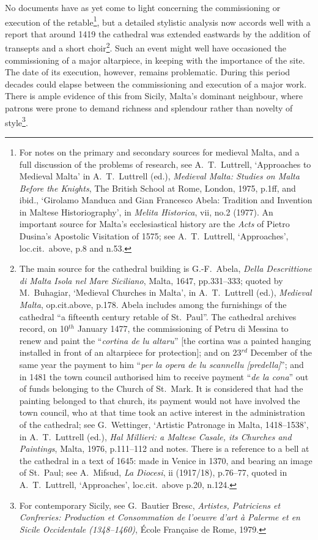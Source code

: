 \documentclass[a4paper,12pt]{article}
\begin{document}
No documents have as yet come to light concerning the commissioning or
execution of the retable\footnote{For notes on the primary and
secondary sources for medieval Malta, and a full discussion of the
problems of research, see A.~T.~Luttrell, `Approaches to Medieval Malta'
in A.~T.~Luttrell (ed.), \textit{Medieval Malta: Studies on Malta Before
the Knights}, The British School at Rome, London, 1975, p.1ff, and
ibid., `Girolamo Manduca and Gian Francesco Abela: Tradition and
Invention in Maltese Historiography', in \textit{Melita Historica},
vii, no.2 (1977). An important source for Malta's ecclesiastical
history are the \textit{Acts} of Pietro Dusina's Apostolic Visitation
of 1575; see A.~T.~Luttrell, `Approaches', loc.cit.~above, p.8 and n.53.
}, but a detailed stylistic analysis now accords well with a report
that around 1419 the cathedral was extended eastwards by the addition
of transepts and a short choir\footnote{The main source for the
cathedral building is G.-F.~Abela, \textit{Della Descrittione di Malta
Isola nel Mare Siciliano}, Malta, 1647, pp.331--333; quoted by
M.~Buhagiar, `Medieval Churches in Malta', in A.~T.~Luttrell (ed.),
\textit{Medieval Malta}, op.cit.above, p.178. Abela includes among the
furnishings of the cathedral ``a fifteenth century retable of
St.~Paul''. The cathedral archives record, on 10$^{th}$ January 1477,
the commissioning of Petru di Messina to renew and paint the
``\textit{cortina de lu altaru}'' [the cortina was a painted hanging
installed in front of an altarpiece for protection]; and on 23$^{rd}$
December of the same year the payment to him ``\textit{per la opera de
lu scannellu [predella]}''; and in 1481 the town council authorised
him to receive payment ``\textit{de la cona}'' out of funds belonging
to the Church of St.~Mark. It is considered that had the painting
belonged to that church, its payment would not have involved the town
council, who at that time took an active interest in the
administration of the cathedral; see G.~Wettinger, `Artistic Patronage
in Malta, 1418--1538', in A.~T.~Luttrell (ed.), \textit{Hal Millieri: a
Maltese Casale, its Churches and Paintings}, Malta, 1976, p.111--112
and notes. There is a reference to a bell at the cathedral in a text
of 1645: made in Venice in 1370, and bearing an image of St.~Paul; see
A.~Mifsud, \textit{La Diocesi}, ii (1917/18), p.76--77, quoted in
A.~T.~Luttrell, `Approaches', loc.cit.~above p.20, n.124.}. Such an
event might well have occasioned the commissioning of a major
altarpiece, in keeping with the importance of the site. The date of
its execution, however, remains problematic. During this period
decades could elapse between the commissioning and execution of a
major work. There is ample evidence of this from Sicily, Malta's
dominant neighbour, where patrons were prone to demand richness and
splendour rather than novelty of style\footnote{For contemporary
Sicily, see G.~Bautier Bresc, \textit{Artistes, Patriciens et
Confreries: Production et Consommation de l'oeuvre d'art \`a Palerme et
en Sicile Occidentale (1348--1460)}, \'Ecole Fran\c{c}aise de Rome, 1979.}.
\end{document}

